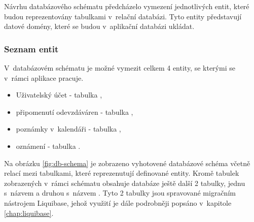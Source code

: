 Návrhu databázového schématu předcházelo vymezení jednotlivých entit, které budou reprezentovány tabulkami v~relační databázi. Tyto entity představují datové domény, které se budou v~aplikační databázi ukládat.

\subsubsection{Seznam entit}

V~databázovém schématu je možné vymezit celkem 4 entity, se kterými se v~rámci aplikace pracuje.

\begin{itemize}
    \item Uživatelský účet - tabulka ,
    \item připomenutí odevzdáváren - tabulka ,
    \item poznámky v~kalendáři - tabulka ,
    \item oznámení - tabulka .
\end{itemize}

Na obrázku \ref{fig:db-schema} je zobrazeno vyhotovené databázové schéma včetně relací mezi tabulkami, které reprezenutují definované entity. Kromě tabulek zobrazených v~rámci schématu obsahuje databáze ještě další 2 tabulky, jednu s~názvem  a druhou s~názvem . Tyto 2 tabulky jsou spravované migračním nástrojem Liquibase, jehož využití je dále podrobněji popsáno v~kapitole \ref{chap:liquibase}.

